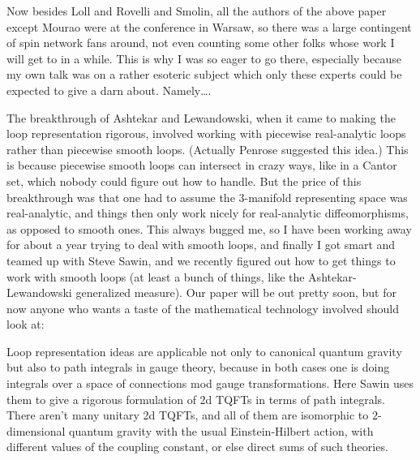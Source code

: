 \documentclass{article}
\def\tightlist{}
\renewcommand{\texttt}[1]{%
  \begingroup
  \ttfamily
  \begingroup\lccode`~=`/\lowercase{\endgroup\def~}{/\discretionary{}{}{}}%
  \begingroup\lccode`~=`[\lowercase{\endgroup\def~}{[\discretionary{}{}{}}%
  \begingroup\lccode`~=`.\lowercase{\endgroup\def~}{.\discretionary{}{}{}}%
  \catcode`/=\active\catcode`[=\active\catcode`.=\active
  \scantokens{#1\noexpand}%
  \endgroup
}
\begin{document}
Now besides Loll and Rovelli and Smolin, all the authors of the above
paper except Mourao were at the conference in Warsaw, so there was a
large contingent of spin network fans around, not even counting some
other folks whose work I will get to in a while. This is why I was so
eager to go there, especially because my own talk was on a rather
esoteric subject which only these experts could be expected to give a
darn about. Namely\ldots.

The breakthrough of Ashtekar and Lewandowski, when it came to making the
loop representation rigorous, involved working with piecewise
real-analytic loops rather than piecewise smooth loops. (Actually
Penrose suggested this idea.) This is because piecewise smooth loops can
intersect in crazy ways, like in a Cantor set, which nobody could figure
out how to handle. But the price of this breakthrough was that one had
to assume the 3-manifold representing space was real-analytic, and
things then only work nicely for real-analytic diffeomorphisms, as
opposed to smooth ones. This always bugged me, so I have been working
away for about a year trying to deal with smooth loops, and finally I
got smart and teamed up with Steve Sawin, and we recently figured out
how to get things to work with smooth loops (at least a bunch of things,
like the Ashtekar-Lewandowski generalized measure). Our paper will be
out pretty soon, but for now anyone who wants a taste of the
mathematical technology involved should look at:


Loop representation ideas are applicable not only to canonical quantum
gravity but also to path integrals in gauge theory, because in both
cases one is doing integrals over a space of connections mod gauge
transformations. Here Sawin uses them to give a rigorous formulation of
2d TQFTs in terms of path integrals. There aren't many unitary 2d TQFTs,
and all of them are isomorphic to \(2\)-dimensional quantum gravity with
the usual Einstein-Hilbert action, with different values of the coupling
constant, or else direct sums of such theories.
\end{document}
